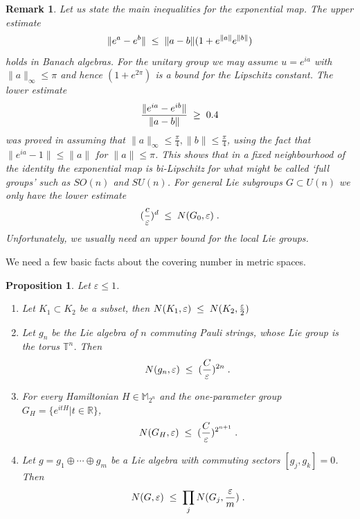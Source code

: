 \documentclass[12pt, a4-paper]{amsart}
\numberwithin{equation}{section}
\newcommand{\kl}{\pl \le \pl}
\newcommand{\gl}{\pl \ge \pl}
\newcommand{\rz}{{\mathbb R}}
\newcommand{\pl}{\hspace{.1cm}}
\newcommand{\eps}{\varepsilon}
\newcommand{\mz}{{\mathbb M}}
\newtheorem{rem}[lemma]{Remark}
\newtheorem{prop}[lemma]{Proposition}
\begin{document}
\begin{rem}\label{Lipschitz} Let us state the main inequalities for the exponential map. The upper estimate  
 \begin{equation}\label{up}
  \|e^{a}-e^{b}\|\kl \|a-b\| (1+e^{\|a\|}e^{\|b\|})
  \end{equation} 
holds in Banach algebras. For the unitary group we may assume $u=e^{ia}$ with $\|a\|_{\infty}\le \pi$ and hence $(1+e^{2\pi})$ is a bound for the  Lipschitz constant. The lower estimate
 \[ \frac{\|e^{ia}-e^{ib}\|}{\|a-b\|} \gl 0.4 \]
was proved in \cite[Lemma 4]{Szarek1998MetricSpaces} assuming that $\|a\|_{\infty} \le \frac{\pi}{4}, \|b\|\le \frac{\pi}{4}$, using the fact that  $\|e^{ia}-1\|
\le \|a\|$ for $\|a\|\le \pi$. This shows that in a fixed neighbourhood of the identity the exponential map is bi-Lipschitz for what might be called `full groups' such as $SO(n)$ and $SU(n)$. For general Lie subgroups $G\subset U(n)$ we only have the lower estimate 
\[ (\frac{c}{\eps})^d \kl N(G_0,\eps)  \pl. \]
Unfortunately, we usually  need an upper bound for the local Lie groups.  
\end{rem} 

We need a few basic facts about the covering number in metric spaces. 

\begin{prop}\label{basic} Let $\eps\le 1$. 
 \begin{enumerate}
  \item[i)] Let $K_1\subset K_2$ be a subset, then $N(K_1,\eps)\kl N(K_2,\frac{\eps}{2})$
  \item[ii)]  Let $g_n$ be the Lie algebra of $n$ commuting Pauli strings, whose Lie group is the torus $\mathbb{T}^n$. Then   \[ N(g_n ,\eps) \kl (\frac{C}{\eps})^{2n} \pl. \]
  \item[iii)] For every Hamiltonian $H\in \mz_{2^n}$ and the one-parameter group $G_H=\{e^{itH}|t\in \rz\}$,
   \[ N(G_H,\eps) \kl (\frac{C}{\eps})^{2^{n+1}} \pl. \]    
    \item[iv)] Let $g=g_1\oplus \cdots \oplus g_m$ be a Lie algebra with commuting sectors $[g_j,g_k]=0$. Then    
    \[ N(G,\eps) \kl \prod_j N(G_j,\frac{\eps}{m}) \pl. \]
 \end{enumerate}
\end{prop}
\end{document}
